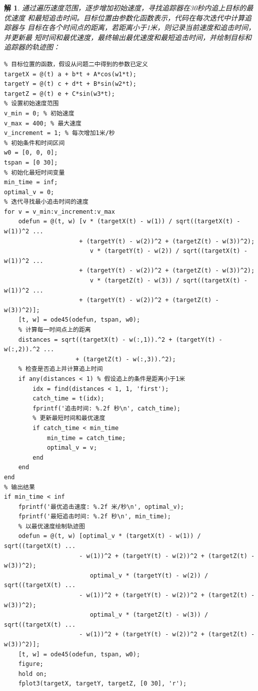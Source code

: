 \documentclass[a4paper, 12pt]{ctexart}
\newtheorem*{theorem}{解}
\begin{document}
\begin{theorem}
    通过遍历速度范围，逐步增加初始速度，寻找追踪器在30秒内追上目标的最优速度
    和最短追击时间。目标位置由参数化函数表示，代码在每次迭代中计算追踪器与
    目标在各个时间点的距离，若距离小于1米，则记录当前速度和追击时间，并更新最
    短时间和最优速度，最终输出最优速度和最短追击时间，并绘制目标和追踪器的轨迹图：
\begin{lstlisting}
% 目标位置的函数，假设从问题二中得到的参数已定义
targetX = @(t) a + b*t + A*cos(w1*t);
targetY = @(t) c + d*t + B*sin(w2*t);
targetZ = @(t) e + C*sin(w3*t);
% 设置初始速度范围
v_min = 0; % 初始速度
v_max = 400; % 最大速度
v_increment = 1; % 每次增加1米/秒
% 初始条件和时间区间
w0 = [0, 0, 0];
tspan = [0 30];
% 初始化最短时间变量
min_time = inf;
optimal_v = 0;
% 迭代寻找最小追击时间的速度
for v = v_min:v_increment:v_max
    odefun = @(t, w) [v * (targetX(t) - w(1)) / sqrt((targetX(t) - w(1))^2 ...
                     + (targetY(t) - w(2))^2 + (targetZ(t) - w(3))^2);
                        v * (targetY(t) - w(2)) / sqrt((targetX(t) - w(1))^2 ...
                     + (targetY(t) - w(2))^2 + (targetZ(t) - w(3))^2);
                        v * (targetZ(t) - w(3)) / sqrt((targetX(t) - w(1))^2 ...
                     + (targetY(t) - w(2))^2 + (targetZ(t) - w(3))^2)];
    [t, w] = ode45(odefun, tspan, w0);
    % 计算每一时间点上的距离
    distances = sqrt((targetX(t) - w(:,1)).^2 + (targetY(t) - w(:,2)).^2 ...
                    + (targetZ(t) - w(:,3)).^2);
    % 检查是否追上并计算追上时间
    if any(distances < 1) % 假设追上的条件是距离小于1米
        idx = find(distances < 1, 1, 'first');
        catch_time = t(idx);
        fprintf('追击时间: %.2f 秒\n', catch_time);
        % 更新最短时间和最优速度
        if catch_time < min_time
            min_time = catch_time;
            optimal_v = v;
        end
    end
end
% 输出结果
if min_time < inf
    fprintf('最优追击速度: %.2f 米/秒\n', optimal_v);
    fprintf('最短追击时间: %.2f 秒\n', min_time);
    % 以最优速度绘制轨迹图
    odefun = @(t, w) [optimal_v * (targetX(t) - w(1)) / sqrt((targetX(t) ... 
                     - w(1))^2 + (targetY(t) - w(2))^2 + (targetZ(t) - w(3))^2);
                        optimal_v * (targetY(t) - w(2)) / sqrt((targetX(t) ...
                     - w(1))^2 + (targetY(t) - w(2))^2 + (targetZ(t) - w(3))^2);
                        optimal_v * (targetZ(t) - w(3)) / sqrt((targetX(t) ... 
                     - w(1))^2 + (targetY(t) - w(2))^2 + (targetZ(t) - w(3))^2)];
    [t, w] = ode45(odefun, tspan, w0);
    figure;
    hold on;
    fplot3(targetX, targetY, targetZ, [0 30], 'r');

\end{lstlisting}
\end{theorem}
\end{document}
